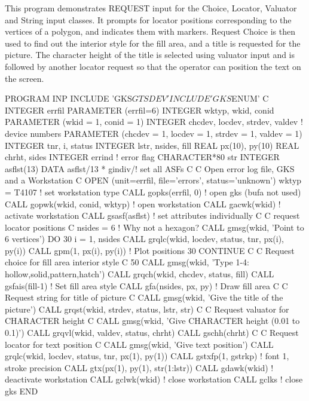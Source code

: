 This program demonstrates REQUEST input for the Choice, Locator,
Valuator and String input classes.
It prompts for locator positions corresponding to the
vertices of a polygon, and indicates them with markers.
Request Choice is then used to find out the interior style
for the fill area, and a title is requested for the picture.
The character height of the title is selected using valuator input
and is followed by another locator request so that the operator can
position the text on the screen.
\begin{XMP}
      PROGRAM INP
      INCLUDE  'GKS$GTSDEV'
      INCLUDE  'GKS$ENUM'
C
      INTEGER      errfil
      PARAMETER   (errfil=6)
      INTEGER      wktyp, wkid,  conid
      PARAMETER   (wkid = 1, conid = 1)
      INTEGER      chcdev, locdev, strdev, valdev  ! device numbers
      PARAMETER   (chcdev = 1, locdev = 1, strdev = 1, valdev = 1)
      INTEGER      tnr, i, status
      INTEGER      lstr, nsides, fill
      REAL         px(10), py(10)
      REAL         chrht, sides
      INTEGER      errind             ! error flag
      CHARACTER*80 str
      INTEGER      asflst(13)
      DATA         asflst/13 * gindiv/! set all ASFs
C
C     Open error log file, GKS and a Workstation
C
      OPEN (unit=errfil, file='errors', status='unknown')
      wktyp = T4107                   ! set workstation type
      CALL gopks(errfil, 0)           ! open gks (bufa not used)
      CALL gopwk(wkid, conid, wktyp)  ! open workstation
      CALL gacwk(wkid)                ! activate workstation
      CALL gsasf(asflst)              ! set attributes individually
C
C     request locator positions
C
      nsides = 6                      ! Why not a hexagon?
      CALL gmsg(wkid, 'Point to 6 vertices')
      DO 30 i = 1, nsides
         CALL grqlc(wkid, locdev, status, tnr, px(i), py(i))
         CALL gpm(1, px(i), py(i))    ! Plot positions
30    CONTINUE
C
C     Request choice for fill area interior style
C
50    CALL gmsg(wkid, 'Type 1-4: hollow,solid,pattern,hatch')
      CALL grqch(wkid, chcdev, status, fill)
      CALL gsfais(fill-1)             ! Set fill area style
      CALL gfa(nsides, px, py)        ! Draw fill area
C
C     Request string for title of picture
C
      CALL gmsg(wkid, 'Give the title of the picture')
      CALL grqst(wkid, strdev, status, lstr, str)
C
C     Request valuator for CHARACTER height
C
      CALL gmsg(wkid, 'Give CHARACTER height (0.01 to 0.1)')
      CALL grqvl(wkid, valdev, status, chrht)
      CALL gschh(chrht)
C
C     Request locator for text position
C
      CALL gmsg(wkid, 'Give text position')
      CALL grqlc(wkid, locdev, status, tnr, px(1), py(1))
      CALL gstxfp(1, gstrkp)          ! font 1, stroke precision
      CALL gtx(px(1), py(1), str(1:lstr))
      CALL gdawk(wkid)                ! deactivate workstation
      CALL gclwk(wkid)                ! close workstation
      CALL gclks                      ! close gks
      END
\end{XMP}
